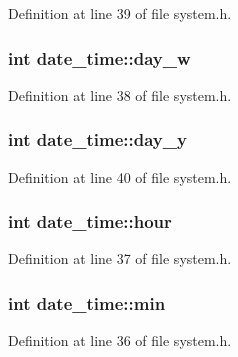 Definition at line 39 of file system.\+h.

\subsubsection[{\texorpdfstring{day\+\_\+w}{day_w}}]{\setlength{\rightskip}{0pt plus 5cm}int date\+\_\+time\+::day\+\_\+w}\hypertarget{structdate__time_aa021771ff83fe860afaaf158932fcb15}{}\label{structdate__time_aa021771ff83fe860afaaf158932fcb15}


Definition at line 38 of file system.\+h.

\subsubsection[{\texorpdfstring{day\+\_\+y}{day_y}}]{\setlength{\rightskip}{0pt plus 5cm}int date\+\_\+time\+::day\+\_\+y}\hypertarget{structdate__time_ad89b6054376708a35bc1c0a186c808ca}{}\label{structdate__time_ad89b6054376708a35bc1c0a186c808ca}


Definition at line 40 of file system.\+h.

\subsubsection[{\texorpdfstring{hour}{hour}}]{\setlength{\rightskip}{0pt plus 5cm}int date\+\_\+time\+::hour}\hypertarget{structdate__time_a4331b46df7b89763a85ea97a246c4ee2}{}\label{structdate__time_a4331b46df7b89763a85ea97a246c4ee2}


Definition at line 37 of file system.\+h.

\subsubsection[{\texorpdfstring{min}{min}}]{\setlength{\rightskip}{0pt plus 5cm}int date\+\_\+time\+::min}\hypertarget{structdate__time_af93fdd2e01117a0171a2583718166d2a}{}\label{structdate__time_af93fdd2e01117a0171a2583718166d2a}


Definition at line 36 of file system.\+h.


